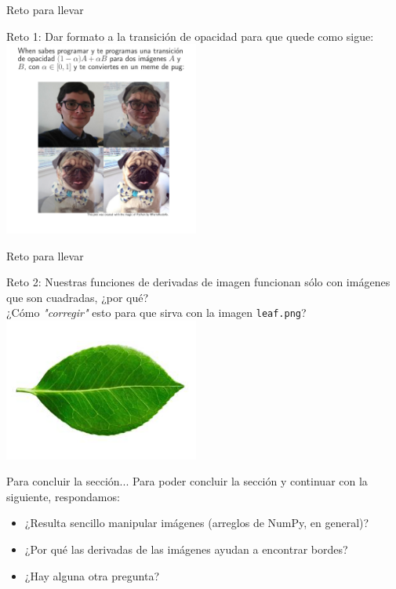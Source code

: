 \documentclass[usenames,dvipsnames]{beamer}
\begin{document}
  \begin{frame}{Reto para llevar}
    \vspace*{0.5cm}
    \begin{block}{Reto 1:}
      Dar formato a la transición de opacidad para que quede como sigue:\\
      \centering
      \includegraphics[width=0.48\textwidth]{imgs/meme}
      \vspace*{0.5cm}
    \end{block}
  \end{frame}

  \begin{frame}{Reto para llevar}
    \vspace*{0.5cm}
    \begin{block}{Reto 2:}
      Nuestras funciones de derivadas de imagen funcionan sólo con imágenes
      que son cuadradas, ¿por qué?\\
      \vspace*{0.5cm}
      ¿Cómo \textit{"corregir"} esto para que sirva con la imagen \texttt{leaf.png}?\\
      \centering
      \includegraphics[width=0.48\textwidth]{../imgs/leaf}
      \vspace*{0.5cm}
    \end{block}
  \end{frame}

  \begin{frame}{Para concluir la sección...}
    Para poder concluir la sección y continuar con la siguiente,
    respondamos:
    \begin{itemize}
      \item ¿Resulta sencillo manipular imágenes (arreglos de NumPy,
      en general)?
      \item ¿Por qué las derivadas de las imágenes ayudan a
      encontrar bordes?
      \item ¿Hay alguna otra pregunta?
    \end{itemize}
  \end{frame}
\end{document}
